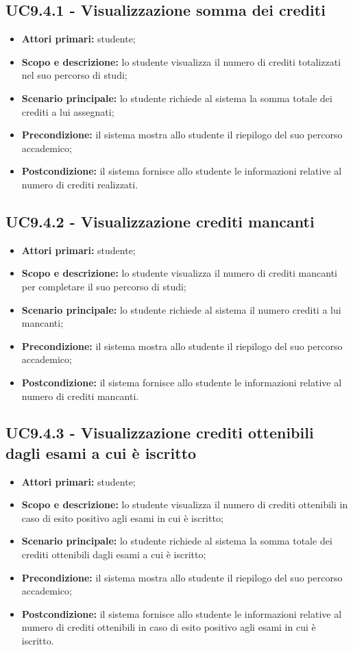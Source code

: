 \documentclass[AnalisiDeiRequisiti.tex]{subfiles}
\begin{document}
\subsection{UC9.4.1 - Visualizzazione somma dei crediti}
\begin{itemize}
	\item \textbf{Attori primari:} studente;
	\item \textbf{Scopo e descrizione:} lo studente visualizza il numero di crediti totalizzati nel suo percorso di studi;
	\item \textbf{Scenario principale:} lo studente richiede al sistema la somma totale dei crediti a lui assegnati;
	\item \textbf{Precondizione:} il sistema mostra allo studente il riepilogo del suo percorso accademico;
	\item \textbf{Postcondizione:} il sistema fornisce allo studente le informazioni relative al numero di crediti realizzati.
\end{itemize}
\subsection{UC9.4.2 - Visualizzazione crediti mancanti}
\begin{itemize}
	\item \textbf{Attori primari:} studente;
	\item \textbf{Scopo e descrizione:} lo studente visualizza il numero di crediti mancanti per completare il suo percorso di studi;
	\item \textbf{Scenario principale:} lo studente richiede al sistema il numero crediti a lui mancanti;
	\item \textbf{Precondizione:} il sistema mostra allo studente il riepilogo del suo percorso accademico;
	\item \textbf{Postcondizione:} il sistema fornisce allo studente le informazioni relative al numero di crediti mancanti.
\end{itemize}
\subsection{UC9.4.3 - Visualizzazione crediti ottenibili dagli esami a cui è iscritto}
\begin{itemize}
	\item \textbf{Attori primari:} studente;
	\item \textbf{Scopo e descrizione:} lo studente visualizza il numero di crediti ottenibili in caso di esito positivo agli esami in cui è iscritto;
	\item \textbf{Scenario principale:} lo studente richiede al sistema la somma totale dei crediti ottenibili dagli esami a cui è iscritto;
	\item \textbf{Precondizione:} il sistema mostra allo studente il riepilogo del suo percorso accademico;
	\item \textbf{Postcondizione:} il sistema fornisce allo studente le informazioni relative al numero di crediti ottenibili in caso di esito positivo agli esami in cui è iscritto.
\end{itemize}
\end{document}
